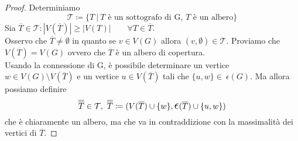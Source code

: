 \documentclass[12pt,twoside]{article}
\newcommand{\Eps}{${\Large$\epsilon$}$}
\begin{document}
\begin{proof}
Determiniamo
$$ \mathcal{T} \coloneqq \{ T \ | \ \text{$T$ è un sottografo di G, $T$ è un albero} \}$$
Sia $\overline{T} \in \mathcal{T} : |V(\overline{T}) | \ge |V(T)| \qquad \forall T \in \overline{T}$.
\\Osservo che $\overline{T} \ne \emptyset$ in quanto se $v \in V(G)$ allora $(v, \emptyset) \in \mathcal{T}$. Proviamo che $V(\overline{T}) = V(G)$ ovvero che $\overline{T}$ è un albero di copertura.\\
Usando la connessione di G, è possibile determinare un vertice $w \in V(G) \setminus V(\overline{T})$ e un vertice $u \in V(\overline{T})$ tali che $\{u, w\} \in\  \Eps(G)$. Ma allora possiamo definire
$$ \overline{\overline{T}} \in \mathcal{T},\ \overline{\overline{T}} \coloneqq(V(\overline{T}) \cup \{w\}, \mathlarger{\mathlarger{\epsilon}}(\overline{T}) \cup \{u, w\})$$
che è chiaramente un albero, ma che va in contraddizione con la massimalità dei vertici di $\overline{T}$.
\end{proof} 
\end{document}
